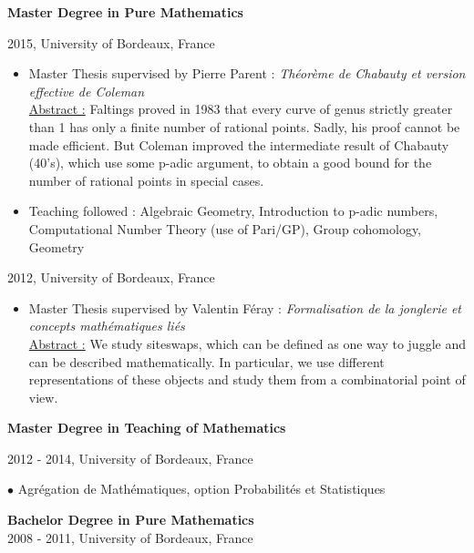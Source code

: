 \documentclass[a4paper,12pt,final]{memoir}
\newcommand{\SmallSep}{\vspace{0.5em}}
\newcommand{\CVItem}[1]
{\textbf{\color{RoyalBlue} #1}}
\begin{document}
\CVItem{Master Degree in Pure Mathematics}

2015, University of Bordeaux, France

\begin{itemize}
\item Master Thesis supervised by Pierre Parent : \textit{Th\'{e}or\`{e}me de Chabauty et version effective de Coleman} \\
  \underline{Abstract :} Faltings proved in 1983 that every curve of genus strictly greater than 1 has only a finite number of rational points. Sadly, his proof cannot be made efficient. But Coleman improved the intermediate result of Chabauty (40’s), which use some p-adic argument, to obtain a good bound for the number of rational points in special cases.

\item Teaching followed : Algebraic Geometry, Introduction to p-adic numbers, Computational Number Theory (use of Pari/GP), Group cohomology, Geometry
\end{itemize}

\clearpage
\framebreak
\framebreak 

2012, University of Bordeaux, France
\begin{itemize}
\item Master Thesis supervised by Valentin F\'{e}ray : \textit{Formalisation de la jonglerie et concepts math\'{e}matiques li\'{e}s} \\ 
  \normalsize\normalfont
  \underline{Abstract :} We study siteswaps, which can be defined as one way to juggle and can be described mathematically. In particular, we use 
  different representations of these objects and study them from a combinatorial point of view.
\end{itemize}

\SmallSep

\CVItem{Master Degree in Teaching of Mathematics}

2012 - 2014, University of Bordeaux, France \vspace{0.2cm}

\hspace{0.4cm} $\bullet$ Agr\'egation de Math\'ematiques, option Probabilit\'es et Statistiques

\vspace{0.2cm}
\SmallSep

\CVItem{Bachelor Degree in Pure Mathematics}\\
2008 - 2011, University of Bordeaux, France
\end{document}
